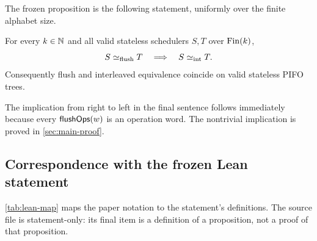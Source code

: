 The frozen proposition is the following statement, uniformly over the finite
alphabet size.

\begin{theorem}
\label{thm:main}
For every \(k\in\mathbb{N}\) and all valid stateless schedulers \(S,T\) over
\(\operatorname{Fin}(k)\),
\[
  S\mathrel{\simeq_{\mathrm{flush}}} T \quad\Longrightarrow\quad S\mathrel{\simeq_{\mathrm{int}}} T.
\]
Consequently flush and interleaved equivalence coincide on valid stateless
PIFO trees.
\end{theorem}

The implication from right to left in the final sentence follows immediately
because every \(\mathsf{flushOps}(w)\) is an operation word.  The nontrivial implication
is proved in \autoref{sec:main-proof}.

\subsection{Correspondence with the frozen Lean statement}

\autoref{tab:lean-map} maps the paper notation to the statement's definitions.
The source file is statement-only: its final item is a definition of a
proposition, not a proof of that proposition.

